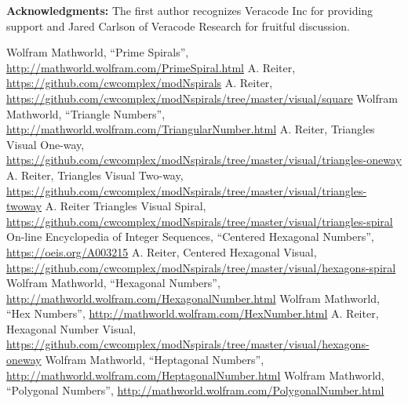 \documentclass[11pt,reqno]{amsart}
\theoremstyle{mydef}
\begin{document}
\vspace{12pt}\noindent\textbf{Acknowledgments:}\quad
The first author recognizes Veracode Inc for providing support and Jared Carlson of Veracode Research for 
fruitful discussion.

\begin{thebibliography}{1}
 Wolfram Mathworld, ``Prime Spirals'',
  \url{http://mathworld.wolfram.com/PrimeSpiral.html}
 A. Reiter,
  \url{https://github.com/cwcomplex/modNspirals}
 A. Reiter,
  \url{https://github.com/cwcomplex/modNspirals/tree/master/visual/square}
 Wolfram Mathworld, ``Triangle Numbers'',
  \url{http://mathworld.wolfram.com/TriangularNumber.html}
 A. Reiter, Triangles Visual One-way, \url{https://github.com/cwcomplex/modNspirals/tree/master/visual/triangles-oneway}
 A. Reiter, Triangles Visual Two-way, \url{https://github.com/cwcomplex/modNspirals/tree/master/visual/triangles-twoway}
 A. Reiter Triangles Visual Spiral, \url{https://github.com/cwcomplex/modNspirals/tree/master/visual/triangles-spiral}
 On-line Encyclopedia of Integer Sequences, ``Centered Hexagonal Numbers'',
 \url{https://oeis.org/A003215}
 A. Reiter, Centered Hexagonal Visual, \url{https://github.com/cwcomplex/modNspirals/tree/master/visual/hexagons-spiral}
 Wolfram Mathworld, ``Hexagonal Numbers'',
  \url{http://mathworld.wolfram.com/HexagonalNumber.html}
 Wolfram Mathworld, ``Hex Numbers'',
  \url{http://mathworld.wolfram.com/HexNumber.html}
 A. Reiter, Hexagonal Number Visual, \url{https://github.com/cwcomplex/modNspirals/tree/master/visual/hexagons-oneway}
 Wolfram Mathworld, ``Heptagonal Numbers'',
  \url{http://mathworld.wolfram.com/HeptagonalNumber.html}
 Wolfram Mathworld, ``Polygonal Numbers'',
  \url{http://mathworld.wolfram.com/PolygonalNumber.html}
\end{thebibliography}
\end{document}
